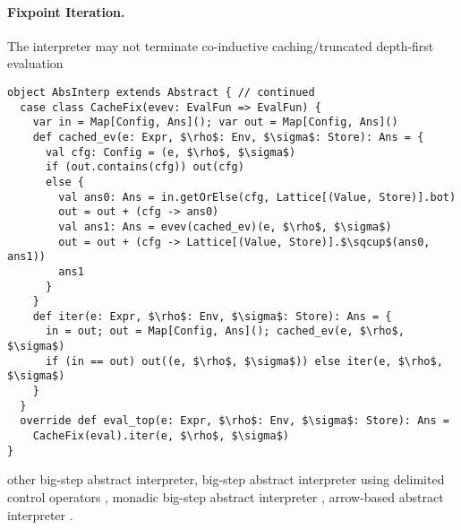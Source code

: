\paragraph{Fixpoint Iteration.}
The interpreter may not terminate
co-inductive caching/truncated depth-first evaluation \cite{DBLP:journals/pacmpl/DaraisLNH17, Wei:2018:RAA:3243631.3236800, Rosendahl:AbsIntPL}

\begin{lstlisting}
object AbsInterp extends Abstract { // continued
  case class CacheFix(evev: EvalFun => EvalFun) {
    var in = Map[Config, Ans](); var out = Map[Config, Ans]()
    def cached_ev(e: Expr, $\rho$: Env, $\sigma$: Store): Ans = {
      val cfg: Config = (e, $\rho$, $\sigma$)
      if (out.contains(cfg)) out(cfg)
      else {
        val ans0: Ans = in.getOrElse(cfg, Lattice[(Value, Store)].bot)
        out = out + (cfg -> ans0)
        val ans1: Ans = evev(cached_ev)(e, $\rho$, $\sigma$)
        out = out + (cfg -> Lattice[(Value, Store)].$\sqcup$(ans0, ans1))
        ans1
      }
    }
    def iter(e: Expr, $\rho$: Env, $\sigma$: Store): Ans = {
      in = out; out = Map[Config, Ans](); cached_ev(e, $\rho$, $\sigma$)
      if (in == out) out((e, $\rho$, $\sigma$)) else iter(e, $\rho$, $\sigma$)
    }
  }
  override def eval_top(e: Expr, $\rho$: Env, $\sigma$: Store): Ans = 
    CacheFix(eval).iter(e, $\rho$, $\sigma$)
}
\end{lstlisting}

other big-step abstract interpreter, 
big-step abstract interpreter using delimited control operators \cite{Wei:2018:RAA:3243631.3236800},
monadic big-step abstract interpreter \cite{DBLP:journals/pacmpl/DaraisLNH17},
arrow-based abstract interpreter \cite{Keidel:2018:CSP:3243631.3236767}.

